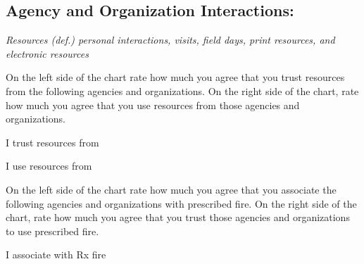 \documentclass[
  english,
  ]{sdapsclassic}
\begin{document}
\begin{questionnaire}
    \section{Agency and Organization Interactions:}
    
    \emph{Resources (def.) personal interactions, visits, field days, print resources, and electronic resources}
    
    
     On the left side of the chart rate how much you agree that you trust resources from the following agencies and organizations. On the right side of the chart, rate how much you agree that you use resources from those agencies and organizations.
    
    \begin{multicols}{2}
    
      \begin{markgroup}{I trust resources from}
      \end{markgroup}
      
      \begin{markgroup}{I use resources from}
      \end{markgroup}
    
    \end{multicols}   
    
     On the left side of the chart rate how much you agree that you associate the following agencies and organizations with prescribed fire. On the right side of the chart, rate how much you agree that you trust those agencies and organizations to use prescribed fire.
    
    \begin{multicols}{2}
    
      \begin{markgroup}{I associate with Rx fire}
      \end{markgroup}
      

\end{multicols}
\end{questionnaire}
\end{document}
